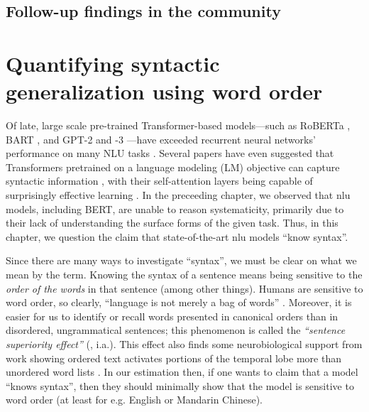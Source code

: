 \documentclass[letterpaper, 12pt]{report}
\begin{document}
\section{Follow-up findings in the community}
\label{sec:clutrr_followup}


\clearpage
\chapter{Quantifying syntactic generalization using word order}
\label{sec:unli}

Of late, large scale pre-trained Transformer-based \citep{vaswani-etal-2017-attention} models---such as RoBERTa \citep{liu-et-al-2019-roberta}, BART \citep{lewis-etal-2020-bart}, and GPT-2 and -3 \citep{radford-etal-2019-language,brown-etal-2020-gpt3}---have exceeded recurrent neural networks' performance on many NLU tasks \citep{wang-etal-2018-glue, wang-etal-2019-superglue}. %
Several papers have even suggested that Transformers pretrained on a language modeling (LM) objective can capture syntactic information \citep{hewitt-manning-2019-structural,jawahar-etal-2019-bert, warstadt-bowman-2020-can, wu-etal-2020-perturbed}, with their self-attention layers being capable of surprisingly effective learning \cite{rogers2020}.
In the preceeding chapter, we observed that \acrshort{nlu} models, including BERT, are unable to reason systematicity, primarily due to their lack of understanding the surface forms of the given task. Thus, in this chapter, we question the claim that state-of-the-art \acrshort{nlu} models ``know syntax''.

Since there are many ways to investigate ``syntax'', we must be clear on what we mean by the term.
Knowing the syntax of a sentence means being sensitive to the \textit{order of the words} in that sentence (among other things).  Humans are sensitive to word order, so clearly, ``language is not merely a bag of words'' \citep[p.156]{harris-1954-distributional}.
Moreover, it is easier for us to identify or recall words presented in canonical orders than in disordered, ungrammatical sentences; this phenomenon is called the \textit{``sentence superiority effect''} (\citealt{cattell-1886-time, scheerer1981early, toyota-2001-changes, baddeley-etal-2009-working, snell-grainger-2017-sentence, snell2019word, wen-etal-2019-parallel}, i.a.).
This effect also finds some neurobiological support from work showing ordered text activates portions of the temporal lobe more than unordered word lists \citep{bemis-pylkkanen-2013-basic, pylkkanen-etal-2014-building}.
In our estimation then, if one wants to claim that  a model ``knows syntax'', then they should minimally show that the model is sensitive to word order (at least for e.g. English or Mandarin Chinese).
\end{document}
